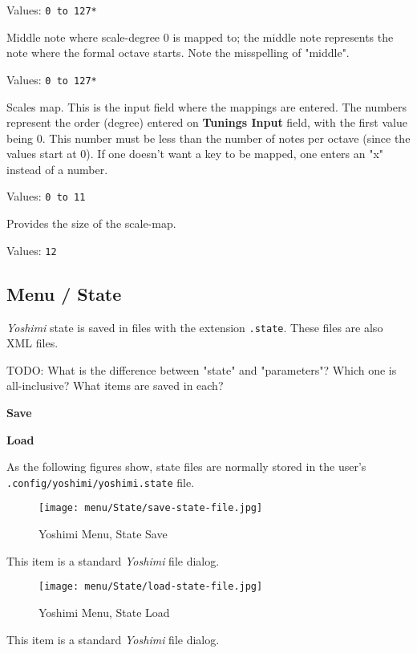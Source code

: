    Values: \texttt{0 to 127*}

   Middle note where scale-degree 0 is mapped to;
   the middle note represents the note where the formal octave starts.
   Note the misspelling of "middle".

   Values: \texttt{0 to 127*}

   Scales map.  This is the input field where the mappings are entered.
   The numbers represent the order (degree) entered on
   \textbf{Tunings Input} field, with the first value being 0.
   This number must be less than the number of notes per octave (since
   the values start at 0).
   If one doesn't want a key to be mapped, one enters an "x" instead of a
   number.

   Values: \texttt{0 to 11}

   Provides the size of the scale-map.

   Values: \texttt{12}

\subsection{Menu / State}
\label{subsec:menu_state}

   \textsl{Yoshimi} state is saved in files with the extension
   \texttt{.state}.  These files are also XML files.

   TODO: What is the difference between "state" and "parameters"?
   Which one is all-inclusive?  What items are saved in each?

   \begin{enumber}
      \item \textbf{Save}
      \item \textbf{Load}
   \end{enumber}

   As the following figures show, state files are normally stored in the
   user's \texttt{.config/yoshimi/yoshimi.state} file.

\begin{figure}[H]
   \centering 
   \texttt{[image: menu/State/save-state-file.jpg]}
   \caption{Yoshimi Menu, State Save}
   \label{fig:yoshimi_menu_state_save}
\end{figure}

   This item is a standard \textsl{Yoshimi} file dialog.

\begin{figure}[H]
   \centering 
   \texttt{[image: menu/State/load-state-file.jpg]}
   \caption{Yoshimi Menu, State Load}
   \label{fig:yoshimi_menu_state_load}
\end{figure}

   This item is a standard \textsl{Yoshimi} file dialog.

